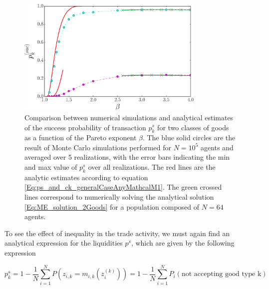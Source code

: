 \begin{figure}
\includegraphics[width=0.8\textwidth]{figs_ineq/fig_K=2_e=1p2_ps_prediction_adjustedcapital.pdf}
\caption{Comparison between numerical simulations and analytical estimates of the success probability of transaction $p^s_k$ for two classes of goods as a function of the Pareto exponent $\beta$. The blue solid circles are the result  of Monte Carlo simulations performed for $N=10^5$ agents and averaged over 5 realizations, with the error bars indicating the min and max value of $p^s_k$ over all realizations. The red lines are the analytic estimates  according to equation \eqref{Eq:ps_and_ck_generalCaseAnyMathcalM1}. The green crossed lines correspond to numerically solving the analytical solution  \eqref{Eq:ME_solution_2Goods} for a population composed of $N=64$ agents.}
\label{Fig:summary_section_one_object}
\end{figure}

To see the effect of inequality in the trade activity, we must again find an analytical expression for the liquidities $p^s$, which are given by the following expression

\begin{equation}
p^s_{k} = 1 - \frac{1}{N}\sum_{i=1}^N P\left(z_{i,k}=m_{i,k}(z_i^{(k)})\right) = 1 - \frac{1}{N}\sum_{i=1}^N P_i(\text{not accepting good type k})
\label{eq:psk_sum}
\end{equation}

